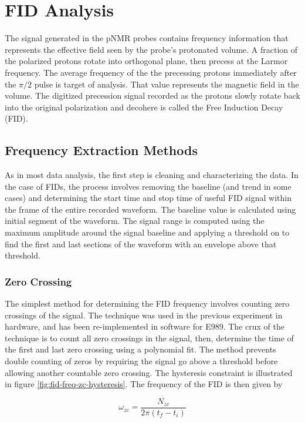 \chapter{FID Analysis}

The signal generated in the pNMR probes contains frequency information that represents the effective field seen by the probe's protonated volume.  A fraction of the polarized protons rotate into orthogonal plane, then precess at the Larmor frequency.  The average frequency of the the precessing protons immediately after the $\pi/2$ pulse is target of analysis.  That value represents the magnetic field in the volume.  The digitized precession signal recorded as the protons slowly rotate back into the original polarization and decohere is called the Free Induction Decay (FID).

\section{Frequency Extraction Methods}

As in most data analysis, the first step is cleaning and characterizing the data.  In the case of FIDs, the process involves removing the baseline (and trend in some cases) and determining the start time and stop time of useful FID signal within the frame of the entire recorded waveform.  The baseline value is calculated using initial segment of the waveform.  The signal range is computed using the maximum amplitude around the signal baseline and applying a threshold on to find the first and last sections of the waveform with an envelope above that threshold.

\subsection{Zero Crossing}
The simplest method for determining the FID frequency involves counting zero crossings of the signal.  The technique was used in the previous \mugmtwo experiment in hardware, and has been re-implemented in software for E989.  The crux of the technique is to count all zero crossings in the signal, then, determine the time of the first and last zero crossing using a polynomial fit.  The method prevents double counting of zeros by requiring the signal go above a threshold before allowing another countable zero crossing.  The hysteresis constraint is illustrated in figure \ref{fig:fid-freq-zc-hysteresis}.  The frequency of the FID is then given by

\begin{equation}
\label{eqn:fig-freq-zc}
\omega_{zc} = \frac{N_{zc}}{2\pi(t_f - t_i)}
\end{equation}

